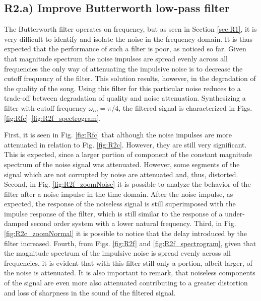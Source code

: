 \documentclass[]{scrartcl}
\begin{document}
\subsection{R2.a) Improve Butterworth low-pass filter}
The Butterworth filter operates on frequency, but as seen in Section \ref{sec:R1}, it is very difficult to identify and isolate the noise in the frequency domain. It is thus expected that the performance of such a filter is poor, as noticed so far. Given that magnitude spectrum the noise impulses are spread evenly across all frequencies the only way of attenuating the impulsive noise is to decrease the cutoff frequency of the filter. This solution results, however, in the degradation of the quality of the song. Using this filter for this particular noise reduces to a trade-off between degradation of quality and noise attenuation. Synthesizing a filter with cutoff frequency $\omega_{co} = \pi/4$, the filtered signal is characterized in Figs. \ref{fig:Rfc}--\ref{fig:R2f_spectrogram}. 

First, it is seen in Fig. \ref{fig:Rfc} that although the noise impulses are more attenuated in relation to Fig. \ref{fig:R2c}. However, they are still very significant. This is expected, since a larger portion of component of the constant magnitude spectrum of the noise signal was attenuated. However, some segments of the signal which are not corrupted by noise are attenuated and, thus, distorted. Second, in Fig. \ref{fig:R2f_zoomNoise} it is possible to analyze the behavior of the filter after a noise impulse in the time domain. After the noise impulse, as expected, the response of the noiseless signal is still superimposed with the impulse response of the filter, which is still similar to the response of a under-damped second order system with a lower natural frequency. Third, in Fig. \ref{fig:R2c_zoomNormal} it is possible to notice that the delay introduced by the filter increased. Fourth, from Figs. \ref{fig:R2f} and \ref{fig:R2f_spectrogram}, given that the magnitude spectrum of the impulsive noise is spread evenly across all frequencies, it is evident that with this filter still only a portion, albeit larger, of the noise is attenuated. It is also important to remark, that noiseless components of the signal are even more also attenuated contributing to a greater distortion and loss of sharpness in the sound of the filtered signal.
 
\end{document}
